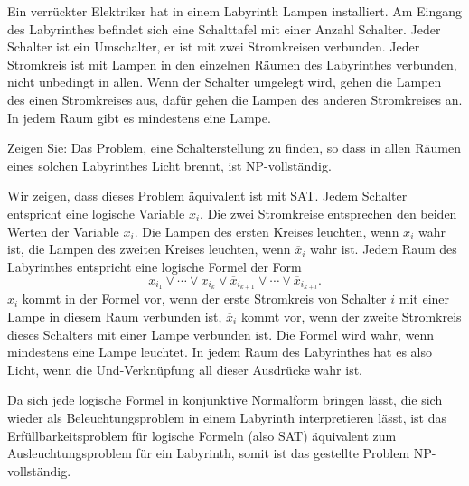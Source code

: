 Ein verrückter Elektriker hat in einem Labyrinth Lampen installiert.
Am Eingang des Labyrinthes befindet sich eine Schalttafel mit einer
Anzahl Schalter. Jeder Schalter ist ein Umschalter, er ist mit
zwei Stromkreisen verbunden. Jeder Stromkreis ist mit Lampen in
den einzelnen Räumen des Labyrinthes verbunden, nicht unbedingt in
allen.
Wenn der
Schalter umgelegt wird, gehen die Lampen des einen
Stromkreises aus, dafür gehen die Lampen des anderen Stromkreises an.
In jedem Raum gibt es mindestens eine Lampe.

Zeigen Sie: Das Problem, eine Schalterstellung zu finden, so
dass in allen Räumen eines solchen Labyrinthes Licht brennt,
ist NP-vollständig.


\begin{loesung}
Wir zeigen, dass dieses Problem äquivalent ist mit SAT. Jedem Schalter
entspricht eine logische Variable $x_i$. Die zwei Stromkreise entsprechen
den beiden Werten der Variable $x_i$. Die Lampen des ersten Kreises leuchten,
wenn $x_i$ wahr ist, die Lampen des zweiten Kreises leuchten, wenn
$\overline x_i$ wahr ist.
Jedem Raum des Labyrinthes entspricht eine logische Formel der Form
\[
x_{i_1}\vee \cdots \vee x_{i_k}\vee \overline x_{i_{k+1}}\vee \cdots\vee \overline x_{i_{k+l}}.
\]
$x_i$ kommt in der Formel vor, wenn der erste Stromkreis von Schalter $i$
mit einer Lampe in diesem Raum verbunden ist, $\overline x_i$ kommt vor,
wenn der zweite Stromkreis dieses Schalters mit einer Lampe verbunden ist.
Die Formel wird wahr, wenn mindestens eine Lampe leuchtet. In jedem Raum
des Labyrinthes hat es also Licht, wenn die Und-Verknüpfung all dieser
Ausdrücke wahr ist.

Da sich jede logische Formel in konjunktive Normalform bringen lässt,
die sich wieder als Beleuchtungsproblem in einem Labyrinth interpretieren
lässt, ist das Erfüllbarkeitsproblem für logische Formeln (also SAT)
äquivalent zum Ausleuchtungsproblem für ein Labyrinth, somit ist
das gestellte Problem NP-vollständig.
\end{loesung}
